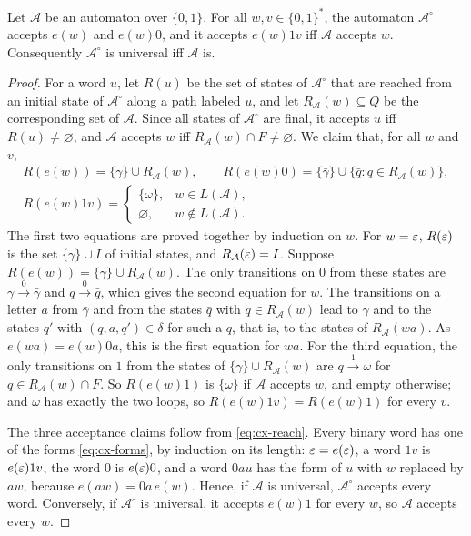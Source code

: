 \begin{lemma}\label{lem:cx-allfinal}
Let $\mathcal A$ be an automaton over $\{0,1\}$. For all $w,v\in\{0,1\}^*$,
the automaton $\mathcal A^\circ$ accepts $e(w)$ and $e(w)0$, and it accepts
$e(w)1v$ iff $\mathcal A$ accepts $w$. Consequently $\mathcal A^\circ$ is
universal iff $\mathcal A$ is.
\end{lemma}

\begin{proof}
For a word $u$, let $R(u)$ be the set of states of $\mathcal A^\circ$ that
are reached from an initial state of $\mathcal A^\circ$ along a path labeled
$u$, and let $R_{\mathcal A}(w)\subseteq Q$ be the corresponding set of
$\mathcal A$. Since all states of $\mathcal A^\circ$ are final, it accepts
$u$ iff $R(u)\ne\varnothing$, and $\mathcal A$ accepts $w$ iff
$R_{\mathcal A}(w)\cap F\ne\varnothing$. We claim that, for all $w$ and $v$,
\begin{equation}\label{eq:cx-reach}
\begin{gathered}
 R(e(w))=\{\gamma\}\cup R_{\mathcal A}(w),\qquad
 R(e(w)0)=\{\bar\gamma\}\cup\{\bar q:q\in R_{\mathcal A}(w)\},\\
 R(e(w)1v)=\begin{cases}\{\omega\},&w\in L(\mathcal A),\\
   \varnothing,&w\notin L(\mathcal A).\end{cases}
\end{gathered}
\end{equation}
The first two equations are proved together by induction on $w$. For
$w=\varepsilon$, $R(\varepsilon)$ is the set $\{\gamma\}\cup I$ of initial states, and
$R_{\mathcal A}(\varepsilon)=I$. Suppose $R(e(w))=\{\gamma\}\cup R_{\mathcal A}(w)$.
The only transitions on $0$ from these states are
$\gamma\xrightarrow0\bar\gamma$ and $q\xrightarrow0\bar q$, which gives the
second equation for $w$. The transitions on a letter $a$ from $\bar\gamma$
and from the states $\bar q$ with $q\in R_{\mathcal A}(w)$ lead to $\gamma$
and to the states $q'$ with $(q,a,q')\in\delta$ for such a $q$, that is, to
the states of $R_{\mathcal A}(wa)$. As $e(wa)=e(w)0a$, this is the first
equation for $wa$. For the third equation, the only transitions on $1$ from
the states of $\{\gamma\}\cup R_{\mathcal A}(w)$ are $q\xrightarrow1\omega$
for $q\in R_{\mathcal A}(w)\cap F$. So $R(e(w)1)$ is $\{\omega\}$ if
$\mathcal A$ accepts $w$, and empty otherwise; and $\omega$ has exactly the
two loops, so $R(e(w)1v)=R(e(w)1)$ for every $v$.

The three acceptance claims follow from \eqref{eq:cx-reach}. Every binary
word has one of the forms \eqref{eq:cx-forms}, by induction on its length:
$\varepsilon=e(\varepsilon)$, a word $1v$ is $e(\varepsilon)1v$, the word $0$ is $e(\varepsilon)0$, and a
word $0au$ has the form of $u$ with $w$ replaced by $aw$, because
$e(aw)=0a\,e(w)$. Hence, if $\mathcal A$ is universal, $\mathcal A^\circ$
accepts every word. Conversely, if $\mathcal A^\circ$ is universal, it
accepts $e(w)1$ for every $w$, so $\mathcal A$ accepts every $w$.
\end{proof}

